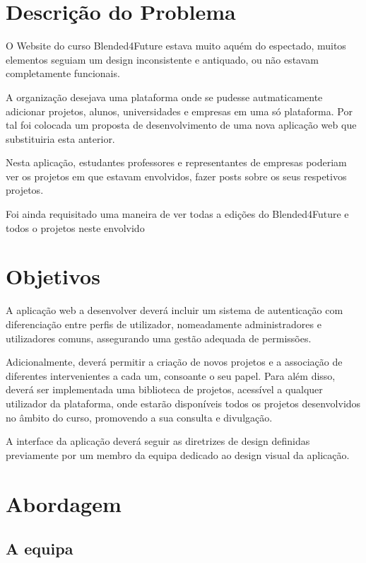\section{Descrição do Problema}
\label{sec:introducao_descproblema}

O Website do curso Blended4Future estava muito aquém do espectado, muitos elementos seguiam um design inconsistente e antiquado, ou não estavam completamente funcionais. 

A organização desejava uma plataforma onde se pudesse autmaticamente adicionar projetos, alunos, universidades e empresas em uma só plataforma. Por tal foi colocada um proposta de desenvolvimento de uma nova aplicação web que substituiria esta anterior. 

Nesta aplicação, estudantes professores e representantes de empresas poderiam ver os projetos em que estavam envolvidos, fazer posts sobre os seus respetivos projetos.

Foi ainda requisitado uma maneira de ver todas a edições do Blended4Future e todos o projetos neste envolvido

\section{Objetivos}

A aplicação web a desenvolver deverá incluir um sistema de autenticação com diferenciação entre perfis de utilizador, nomeadamente administradores e utilizadores comuns, assegurando uma gestão adequada de permissões. 

Adicionalmente, deverá permitir a criação de novos projetos e a associação de diferentes intervenientes a cada um, consoante o seu papel. Para além disso, deverá ser implementada uma biblioteca de projetos, acessível a qualquer utilizador da plataforma, onde estarão disponíveis todos os projetos desenvolvidos no âmbito do curso, promovendo a sua consulta e divulgação.

A interface da aplicação deverá seguir as diretrizes de design definidas previamente por um membro da equipa dedicado ao design visual da aplicação.


\section{Abordagem}

\subsection{A equipa}

